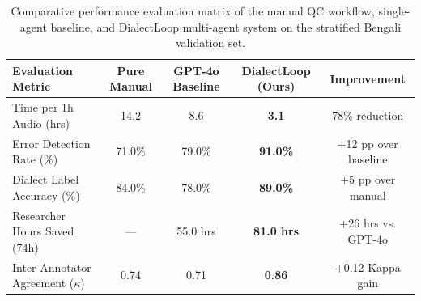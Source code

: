 
\begin{table}[t]
\centering
\small
\begin{tabular}{lcccc}
\toprule
\textbf{Evaluation Metric} & \textbf{Pure Manual} & \textbf{GPT-4o Baseline} & \textbf{DialectLoop (Ours)} & \textbf{Improvement} \\
\midrule
Time per 1h Audio (hrs) & 14.2 & 8.6 & \textbf{3.1} & 78\% reduction \\
Error Detection Rate (\%) & 71.0\% & 79.0\% & \textbf{91.0\%} & +12 pp over baseline \\
Dialect Label Accuracy (\%) & 84.0\% & 78.0\% & \textbf{89.0\%} & +5 pp over manual \\
Researcher Hours Saved (74h) & --- & 55.0 hrs & \textbf{81.0 hrs} & +26 hrs vs. GPT-4o \\
Inter-Annotator Agreement ($\kappa$) & 0.74 & 0.71 & \textbf{0.86} & +0.12 Kappa gain \\
\bottomrule
\end{tabular}
\caption{Comparative performance evaluation matrix of the manual QC workflow, single-agent baseline, and DialectLoop multi-agent system on the stratified Bengali validation set.}
\label{tab:performance_summary}
\end{table}
